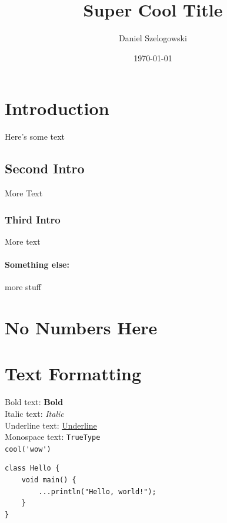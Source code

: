 \documentclass[10pt, letterpaper]{article}  %
\title{Super Cool Title}
\author{Daniel Szelogowski}
\date{\today}
\begin{document}
\maketitle

\tableofcontents
\clearpage  %


\section{Introduction}

Here's some text

\subsection{Second Intro}

More Text

\subsubsection{Third Intro}

More text

\paragraph{Something else:} more stuff




\section*{No Numbers Here}

\section{Text Formatting}

Bold text: \textbf{Bold} \\  %
Italic text: \textit{Italic} \\
Underline text: \underline{Underline} \\
Monospace text: \texttt{TrueType} \\
\quad\quad      \verb|cool('wow')|

\begin{verbatim}
class Hello {
    void main() {
        ...println("Hello, world!");
    }
}
\end{verbatim}
\end{document}
